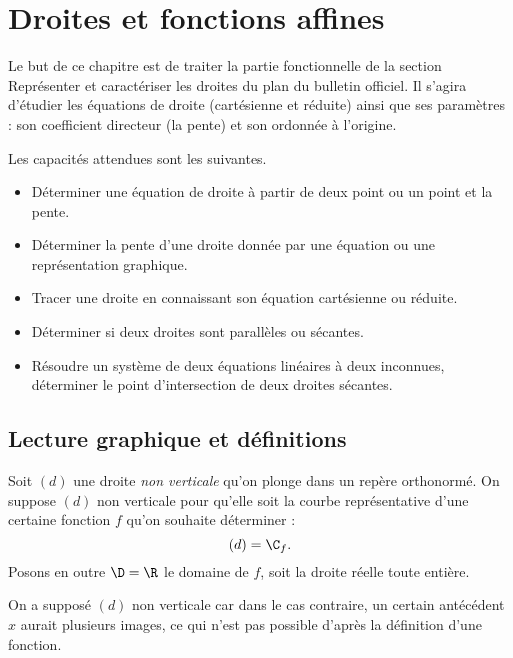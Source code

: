 
\chapter{Droites et fonctions affines}

Le but de ce chapitre est de traiter la partie fonctionnelle de la section \og Représenter et caractériser les droites du plan \fg du bulletin officiel.
Il s'agira d'étudier les équations de droite (cartésienne et réduite) ainsi que ses paramètres : son coefficient directeur (la pente) et son ordonnée à l'origine.

Les capacités attendues sont les suivantes.
	\begin{itemize}
		\item Déterminer une équation de droite à partir de deux point ou un point et la pente.
		\item Déterminer la pente d'une droite donnée par une équation ou une représentation graphique.
		\item Tracer une droite en connaissant son équation cartésienne ou réduite.
		\item Déterminer si deux droites sont parallèles ou sécantes.
		\item Résoudre un système de deux équations linéaires à deux inconnues, déterminer le point d'intersection de deux droites sécantes.
	\end{itemize}

\section{Lecture graphique et définitions}

Soit $(d)$ une droite \emph{non verticale} qu'on plonge dans un repère orthonormé.
On suppose $(d)$ non verticale pour qu'elle soit la courbe représentative d'une certaine fonction $f$ qu'on souhaite déterminer : \[(d) = \C_f. \]
Posons en outre $\D = \R$ le domaine de $f$, soit la droite réelle toute entière.

On a supposé $(d)$ non verticale car dans le cas contraire, un certain antécédent $x$ aurait plusieurs images, ce qui n'est pas possible d'après la définition d'une fonction.


